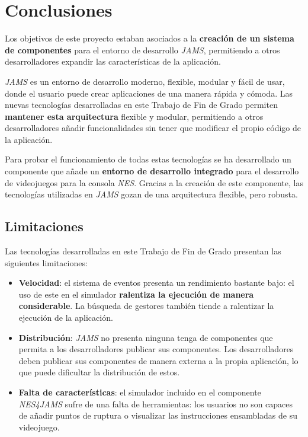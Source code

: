 \chapter{Conclusiones}\label{ch:conclusiones}

Los objetivos de este proyecto estaban asociados
a la \textbf{creación de un sistema de componentes}
para el entorno de desarrollo \textit{JAMS}, permitiendo
a otros desarrolladores expandir las características
de la aplicación.

\textit{JAMS} es un entorno de desarrollo moderno,
flexible, modular y fácil de usar, donde el usuario
puede crear aplicaciones de una manera rápida y cómoda.
Las nuevas tecnologías desarrolladas en este
Trabajo de Fin de Grado permiten \textbf{mantener esta arquitectura}
flexible y modular, permitiendo a otros desarrolladores
añadir funcionalidades sin tener que modificar el propio
código de la aplicación.

Para probar el funcionamiento de todas estas tecnologías
se ha desarrollado un componente que añade un \textbf{entorno
de desarrollo integrado} para el desarrollo de videojuegos
para la consola \textit{NES}.
Gracias a la creación de este componente, las tecnologías
utilizadas en \textit{JAMS} gozan de una arquitectura
flexible, pero robusta.

\section{Limitaciones}\label{sec:limitaciones}

Las tecnologías desarrolladas en este Trabajo
de Fin de Grado presentan las siguientes limitaciones:

\begin{itemize}
    \item \textbf{Velocidad}: el sistema de eventos
    presenta un rendimiento bastante bajo: el uso
    de este en el simulador \textbf{ralentiza la ejecución
    de manera considerable}.
    La búsqueda de gestores también tiende a ralentizar
    la ejecución de la aplicación.
    \item \textbf{Distribución}: \textit{JAMS} no presenta
    ninguna tenga de componentes que permita a los desarrolladores
    publicar sus componentes.
    Los desarrolladores deben publicar sus componentes de manera
    externa a la propia aplicación, lo que puede dificultar
    la distribución de estos.
    \item \textbf{Falta de características}: el simulador
    incluido en el componente \textit{NES4JAMS} sufre
    de una falta de herramientas: los usuarios no son
    capaces de añadir puntos de ruptura o visualizar
    las instrucciones ensambladas de su videojuego.
\end{itemize}

